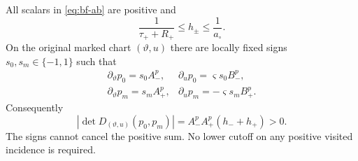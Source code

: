 \begin{theorem}
\label{thm:bf-foot-determinant}
All scalars in \eqref{eq:bf-ab} are positive and
\begin{equation}\label{eq:bf-half-ratio}
 \frac1{\tau_++R_+}\le h_\pm\le\frac1{a_\circ}.
\end{equation}
On the original marked chart $(\vartheta,u)$ there are locally fixed
signs $s_0,s_m\in\{-1,1\}$ such that
\begin{equation}\label{eq:bf-signed-derivatives}
 \begin{array}{ll}
 \partial_\vartheta p_0=s_0 A_-^p,&
 \partial_u p_0=\varsigma s_0 B_-^p,\\[2pt]
 \partial_\vartheta p_m=s_m A_+^p,&
 \partial_u p_m=-\varsigma s_m B_+^p.
 \end{array}
\end{equation}
Consequently
\begin{equation}\label{eq:bf-positive-determinant}
 \left|\det D_{(\vartheta,u)}(p_0,p_m)\right|
       =A_-^p A_+^p(h_-+h_+)>0.
\end{equation}
The signs cannot cancel the positive sum.  No lower cutoff on any
positive visited incidence is required.
\end{theorem}
